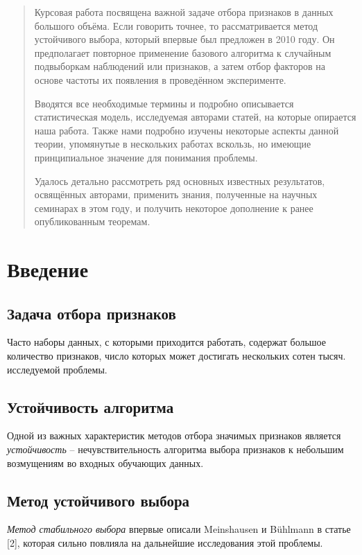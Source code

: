 \documentclass[14pt,a4paper]{extarticle}
\begin{document}
\begin{abstract}
Курсовая работа посвящена важной задаче отбора признаков в данных большого объёма. Если говорить точнее, то рассматривается метод устойчивого выбора, который впервые был предложен в 2010 году. Он предполагает повторное применение базового алгоритма к случайным подвыборкам наблюдений или признаков, а затем отбор факторов на основе частоты их появления в проведённом эксперименте.

Вводятся все необходимые термины и подробно описывается статистическая модель, исследуемая авторами статей, на которые опирается наша работа. Также нами подробно изучены некоторые аспекты данной теории, упомянутые в нескольких работах вскользь, но имеющие принципиальное значение для понимания проблемы. 

 Удалось детально рассмотреть ряд основных известных результатов, освящённых авторами, применить знания, полученные на научных семинарах в этом году, и получить некоторое дополнение к ранее опубликованным теоремам.
\end{abstract}




\newpage
\renewcommand{\contentsname}{Содержание}
\tableofcontents




\newpage
\section{Введение}

\subsection{Задача отбора признаков}
Часто наборы данных, с которыми приходится работать, содержат большое количество признаков, число которых может достигать нескольких сотен тысяч. исследуемой проблемы.

\subsection{Устойчивость алгоритма}
Одной из важных характеристик методов отбора значимых признаков является \textit{устойчивость} -- нечувствительность алгоритма выбора признаков к небольшим возмущениям во входных обучающих данных. 


\subsection{Метод устойчивого выбора}
\textit{Метод стабильного выбора} впервые описали Meinshausen и Bühlmann в статье [2], которая сильно повлияла на дальнейшие исследования этой проблемы. 
\end{document}
